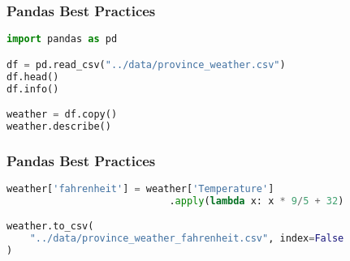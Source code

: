 \documentclass[serif, 9pt, aspectratio=32]{beamer}
\begin{document}
\begin{frame}[fragile]
    \frametitle{Pandas Best Practices}
    \begin{lstlisting}[language=Python]
import pandas as pd

df = pd.read_csv("../data/province_weather.csv")
df.head()
df.info()

weather = df.copy()
weather.describe()
    \end{lstlisting}
\end{frame}

\begin{frame}[fragile]
    \frametitle{Pandas Best Practices}
    \begin{lstlisting}[language=Python]
weather['fahrenheit'] = weather['Temperature']
                            .apply(lambda x: x * 9/5 + 32)

weather.to_csv(
    "../data/province_weather_fahrenheit.csv", index=False
)
    \end{lstlisting}
\end{frame}
\end{document}
